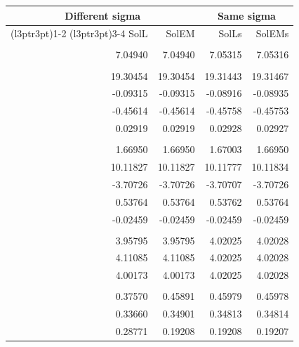 \documentclass{article}\usepackage[]{graphicx}\usepackage[]{color}
\begin{document}
\begin{table}[H]
\centering
\begin{tabular}{rrrr}
\toprule
\multicolumn{2}{c}{Different sigma} & \multicolumn{2}{c}{Same sigma} \\
\cmidrule(l{3pt}r{3pt}){1-2} \cmidrule(l{3pt}r{3pt}){3-4}
SolL & SolEM & SolLs & SolEMs\\
\midrule
\addlinespace[0.3em]
\multicolumn{4}{l}{\textbf{Beta 1}}\\
\hspace{1em}7.04940 & 7.04940 & 7.05315 & 7.05316\\
\addlinespace[0.3em]
\multicolumn{4}{l}{\textbf{Beta 2}}\\
\hspace{1em}19.30454 & 19.30454 & 19.31443 & 19.31467\\
\hspace{1em}-0.09315 & -0.09315 & -0.08916 & -0.08935\\
\hspace{1em}-0.45614 & -0.45614 & -0.45758 & -0.45753\\
\hspace{1em}0.02919 & 0.02919 & 0.02928 & 0.02927\\
\addlinespace[0.3em]
\multicolumn{4}{l}{\textbf{Beta 3}}\\
\hspace{1em}1.66950 & 1.66950 & 1.67003 & 1.66950\\
\hspace{1em}10.11827 & 10.11827 & 10.11777 & 10.11834\\
\hspace{1em}-3.70726 & -3.70726 & -3.70707 & -3.70726\\
\hspace{1em}0.53764 & 0.53764 & 0.53762 & 0.53764\\
\hspace{1em}-0.02459 & -0.02459 & -0.02459 & -0.02459\\
\addlinespace[0.3em]
\multicolumn{4}{l}{\textbf{Sigma}}\\
\hspace{1em}3.95795 & 3.95795 & 4.02025 & 4.02028\\
\hspace{1em}4.11085 & 4.11085 & 4.02025 & 4.02028\\
\hspace{1em}4.00173 & 4.00173 & 4.02025 & 4.02028\\
\addlinespace[0.3em]
\multicolumn{4}{l}{\textbf{Pi}}\\
\hspace{1em}0.37570 & 0.45891 & 0.45979 & 0.45978\\
\hspace{1em}0.33660 & 0.34901 & 0.34813 & 0.34814\\
\hspace{1em}0.28771 & 0.19208 & 0.19208 & 0.19207\\
\bottomrule
\end{tabular}
\end{table}
\end{document}
